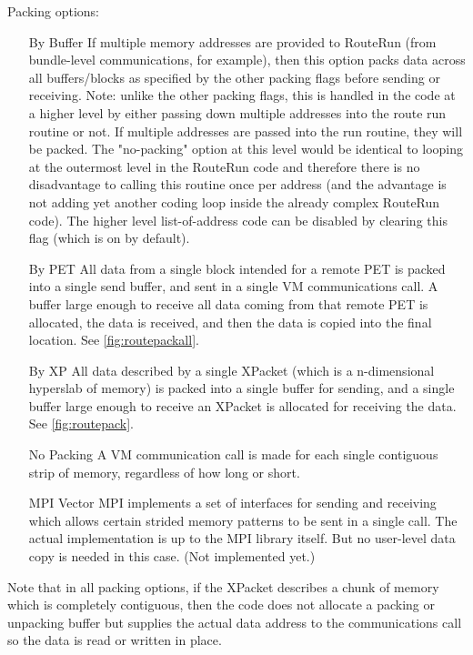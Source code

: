 \begin{enumerate}
Packing options:
\begin{enumerate}
\item[By Buffer]
If multiple memory addresses are provided to RouteRun (from
bundle-level communications, for example), then this option
packs data across all buffers/blocks as specified by the other
packing flags before sending or receiving.
Note: unlike the other packing flags, this is handled in the
code at a higher level by either passing down multiple addresses
into the route run routine or not.  If multiple addresses are
passed into the run routine, they will be packed.  The "no-packing"
option at this level would be identical to looping at the outermost
level in the RouteRun code and therefore there is no disadvantage
to calling this routine once per address (and the advantage is
not adding yet another coding loop inside the already complex
RouteRun code).  The higher level list-of-address code can be
disabled by clearing this flag (which is on by default).
\item[By PET]
All data from a single block
intended for a remote PET is packed into a single send
buffer, and sent in a single VM communications call.  
A buffer large enough to receive all data 
coming from that remote PET is allocated, the data is received,
and then the data is copied into the final location.
See \ref{fig:routepackall}.
\item[By XP]
All data described by a single XPacket (which is a n-dimensional
hyperslab of memory) is packed into a single buffer for sending,
and a single buffer large enough to receive an XPacket is 
allocated for receiving the data.
See \ref{fig:routepack}.
\item[No Packing]
A VM communication call is made for each single contiguous strip
of memory, regardless of how long or short.
\item[MPI Vector]
MPI implements a set of interfaces for sending and receiving which
allows certain strided memory patterns to be sent in a single call.
The actual implementation is up to the MPI library itself.  But no
user-level data copy is needed in this case. (Not implemented yet.)
\end{enumerate}
Note that in all packing options, if the XPacket describes a
chunk of memory which is completely contiguous, then the code
does not allocate a packing or unpacking buffer but supplies the
actual data address to the communications call so the data is
read or written in place.


\end{enumerate}

